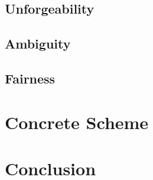 \documentclass{beamer}
\begin{document}
\subsection{Unforgeability}


\subsection{Ambiguity}


\subsection{Fairness}


\section{Concrete Scheme}


\section{Conclusion}

\end{document}
